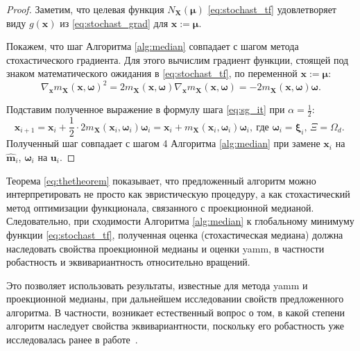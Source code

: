 \begin{proof}
\small
Заметим, что целевая функция $N_{\mathbf{X}}(\boldsymbol{\mu})$ \eqref{eq:stochast_tf} удовлетворяет виду $g(\boldsymbol{x})$ из \eqref{eq:stochast_grad} для $\boldsymbol{x}:=\boldsymbol{\mu}$.


Покажем, что шаг Алгоритма \ref{alg:median} совпадает с шагом метода стохастического градиента. Для этого вычислим градиент функции, стоящей под знаком математического ожидания в \eqref{eq:stochast_tf}, по переменной $\boldsymbol{x}:=\boldsymbol{\mu}$:
\begin{equation*}
\nabla_{\boldsymbol{x}} m_{\mathbf{X}}(\boldsymbol{x}, \boldsymbol{\omega})^2 = 2 m_{\mathbf{X}} (\boldsymbol{x}, \boldsymbol{\omega}) \nabla_{\boldsymbol{x}} m_{\mathbf{X}}(\boldsymbol{x}, \boldsymbol{\omega}) = -2m_{\mathbf{X}} (\boldsymbol{x}, \boldsymbol{\omega})\boldsymbol{\omega}.
\end{equation*}

Подставим полученное выражение в формулу шага \eqref{eq:sg_it} при $\alpha = \frac{1}{2}$:
\begin{equation*}
    \boldsymbol{x}_{i+1} = \boldsymbol{x}_i + \frac 1 2 \cdot 2 m_{\mathbf{X}} (\boldsymbol{x}_i, \boldsymbol{\omega}_i) \boldsymbol{\omega}_i = \boldsymbol{x}_i + m_{\mathbf{X}} (\boldsymbol{x}_i, \boldsymbol{\omega}_i) \boldsymbol{\omega}_i, \ \text{где $\boldsymbol{\omega}_i = \boldsymbol{\xi}_i$, $\Xi = \Omega_d$. }
\end{equation*}
Полученный шаг совпадает с шагом 4 Алгоритма \ref{alg:median} при замене $\boldsymbol{x}_i$ на $\widehat{\mathbf{m}}_{i}$, $\boldsymbol{\omega}_i$ на $\mathbf{u}_i$.
\end{proof}


Теорема \ref{eq:thetheorem} показывает, что предложенный алгоритм можно интерпретировать не просто как эвристическую процедуру, а как стохастический метод оптимизации функционала, связанного с проекционной медианой. Следовательно, при сходимости Алгоритма \ref{alg:median} к глобальному минимуму функции \eqref{eq:stochast_tf}, полученная оценка (стохастическая медиана) должна наследовать свойства проекционной медианы и оценки yamm, в частности робастность и эквивариантность относительно вращений.

Это позволяет использовать результаты, известные для метода yamm и проекционной медианы, при дальнейшем исследовании свойств предложенного алгоритма. В частности, возникает естественный вопрос о том, в какой степени алгоритм наследует свойства эквивариантности, поскольку его робастность уже исследовалась ранее в работе~\cite{filatova2024robust}.

